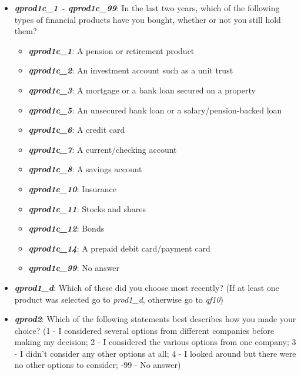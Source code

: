 \documentclass[a4paper,11pt]{article}
\begin{document}
\begin{itemize}
    \item \textit{\textbf{qprod1c\_1 - qprod1c\_99}}: In the last two years, which of the following types of financial products have you bought, whether or not you still hold them? 
    \begin{itemize}
        \item \textit{\textbf{qprod1c\_1}}: A pension or retirement product
        \item \textit{\textbf{qprod1c\_2}}: An investment account such as a unit trust
        \item \textit{\textbf{qprod1c\_3}}: A mortgage or a bank loan secured on a property
        \item \textit{\textbf{qprod1c\_5}}: An unsecured bank loan or a salary/pension-backed loan
        \item \textit{\textbf{qprod1c\_6}}: A credit card
        \item \textit{\textbf{qprod1c\_7}}: A current/checking account
        \item \textit{\textbf{qprod1c\_8}}: A savings account
        \item \textit{\textbf{qprod1c\_10}}: Insurance
        \item \textit{\textbf{qprod1c\_11}}: Stocks and shares
        \item \textit{\textbf{qprod1c\_12}}: Bonds
        \item \textit{\textbf{qprod1c\_14}}: A prepaid debit card/payment card
        \item \textit{\textbf{qprod1c\_99}}: No answer
    \end{itemize}
    
    \item \textit{\textbf{qprod1\_d}}: Which of these did you choose most recently? (If at least one product was selected go to \textit{prod1\_d}, otherwise go to \textit{qf10})

    \item \textit{\textbf{qprod2}}: Which of the following statements best describes how you made your choice? 
    (1 - I considered several options from different companies before making my decision; 2 - I considered the various options from one company; 3 - I didn’t consider any other options at all; 4 - I looked around but there were no other options to consider; -99 - No answer)


\end{itemize}
\end{document}
